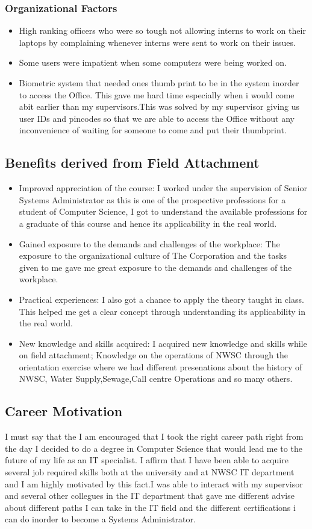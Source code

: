 \documentclass{article}
\begin{document}
\subsubsection{Organizational Factors}
\begin{itemize}
\item High ranking officers who were so tough not allowing interns to work on their laptops by complaining whenever interns were sent to work on their issues.
\item Some users were impatient when some computers were being worked on.
\item Biometric system that needed ones thumb print to be in the system inorder to access the Office. This gave me hard time especially when i would come abit earlier than my supervisors.This was solved by my supervisor giving us user IDs and pincodes so that we are able to access the Office without any inconvenience of waiting for someone to come and put their thumbprint.
\end{itemize}
\subsection{Benefits derived from Field Attachment}
\begin{itemize}
\item Improved appreciation of the course: I worked under the supervision of Senior Systems Administrator as this is one of the prospective professions for a student of Computer Science, I got to understand the available professions for a graduate of this course and hence its applicability in the real world.
\item Gained exposure to the demands and challenges of the workplace: The exposure to the organizational culture of The Corporation and the tasks given to me gave me great exposure to the demands and challenges of the workplace.
\item Practical experiences: I also got a chance to apply the theory taught in class. This helped me get a clear concept through understanding its applicability in the real world.
\item New knowledge and skills acquired: I acquired new knowledge and skills while on field attachment; Knowledge on the operations of NWSC through the orientation exercise where we had different presenations about the history of NWSC, Water Supply,Sewage,Call centre Operations and so many others.
\end{itemize}
\subsection{Career Motivation}
I must say that the I am encouraged that I took the right career path right from the day I decided to do  a degree in Computer Science that would lead me to the future of my life as an IT specialist. I affirm that I have been able to acquire several job
required skills both at the university and at NWSC IT department  and I am highly motivated by this
fact.I was able to interact with my supervisor and several other collegues in the IT department that gave me different advise about different paths I can take in the IT field and the different certifications i can do inorder to become a Systems Administrator.
\newpage
\end{document}

